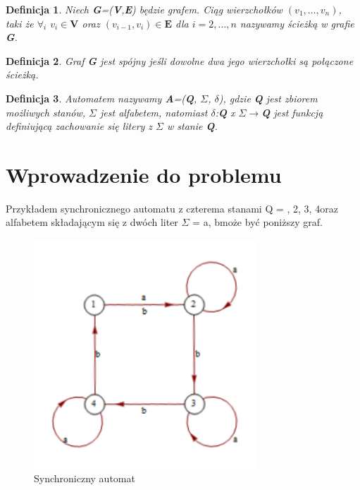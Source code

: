 \documentclass[12pt,a4paper]{article}
\newtheorem{df}{Definicja}[section]
\begin{document}
\begin{df} 
Niech \textbf{G}=(\textbf{V},\textbf{E}) b\k{e}dzie grafem. Ci\k{a}g wierzcho{\l}k\'ow $(v_{1},\ldots,v_{n})$, taki \.ze $\forall_{i}$ $v_{i}\in\textbf{V}$ oraz  $(v_{i-1},v_{i})\in\textbf{E}$ dla $i=2,\ldots,n$ nazywamy \'scie\.zk\k{a} w grafie \textbf{G}.
\end{df} 
\begin{df} 
Graf \textbf{G} jest sp\'ojny je\'sli dowolne dwa jego wierzcho{\l}ki s\k{a} po{\l}\k{a}czone \'scie\.zk\k{a}.
\end{df}
\begin{df} 
Automatem nazywamy \textbf{A}=(\textbf{Q}, \textbf{$\Sigma$}, \textbf{$\delta$}), gdzie \textbf{Q} jest zbiorem mo\.{z}liwych stan\'{o}w, \textbf{$\Sigma$} jest alfabetem, natomiast \textbf{$\delta$}:\textbf{Q} x \textbf{$\Sigma$}$\rightarrow$\textbf{Q} jest funkcj\k{a} definiuj\k{a}c\k{a} 	zachowanie si\k{e} litery z \textbf{$\Sigma$} w stanie \textbf{Q}.
\end{df}


\newpage
\section{Wprowadzenie do problemu}
Przyk{\l}adem synchronicznego automatu z czterema stanami Q = , 2, 3, 4\textbraceright  oraz alfabetem sk{\l}adaj\k{a}cym si\k{e} z dw\'{o}ch liter $\Sigma$ = \textbraceleft a, b\textbraceright  mo\.{z}e by\'c poni\.{z}szy graf.
\begin{figure}[h]
    \centering
    \includegraphics[width=0.75\textwidth]{rysunek1}
    \caption{Synchroniczny automat}
    \label{fig:rysunek1}
\end{figure}
\end{document}
